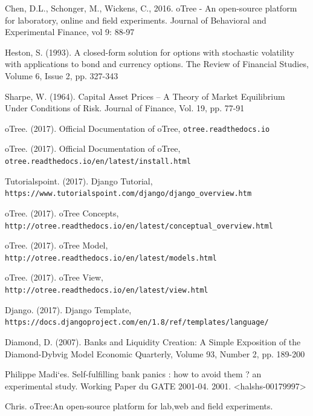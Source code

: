 \begin{thebibliography}{XX}
	
 Chen, D.L., Schonger, M., Wickens, C., 2016. oTree - An open-source platform for laboratory, online and field experiments. Journal of Behavioral and Experimental Finance, vol 9: 88-97

 Heston, S. (1993). A closed-form solution for options with stochastic volatility with applications to bond and currency options.
The Review of Financial Studies, Volume 6, Issue 2, pp. 327-343

 Sharpe, W. (1964). Capital Asset Prices -- A Theory of Market Equilibrium Under Conditions of Risk. Journal of Finance, Vol. 19, pp. 77-91

 oTree. (2017). Official Documentation of oTree, \verb|otree.readthedocs.io|

 oTree. (2017). Official Documentation of oTree,\\ \verb|otree.readthedocs.io/en/latest/install.html|

 Tutorialspoint. (2017). Django Tutorial,\\ \verb|https://www.tutorialspoint.com/django/django_overview.htm|

 oTree. (2017). oTree Concepts,\\ \verb|http://otree.readthedocs.io/en/latest/conceptual_overview.html|

 oTree. (2017). oTree Model,\\ \verb|http://otree.readthedocs.io/en/latest/models.html|

 oTree. (2017). oTree View,\\ \verb|http://otree.readthedocs.io/en/latest/view.html|

 Django. (2017). Django Template,\\ \verb|https://docs.djangoproject.com/en/1.8/ref/templates/language/|

 Diamond, D. (2007). Banks and Liquidity Creation: A Simple Exposition of the Diamond-Dybvig Model 
Economic Quarterly, Volume 93, Number 2, pp. 189-200

 Philippe Madi`es. Self-fulfilling bank panics : how to avoid them ? an experimental study.
Working Paper du GATE 2001-04. 2001. <halshs-00179997>

 Chris. oTree:An open-source platform for lab,web and field experiments.


\end{thebibliography}



